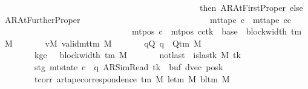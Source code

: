 \begin{isabellebody}
\ \ \ \ \ \ \ \ \ \ \ \ \ \ \ \ \ \ \ \ \ \ \ \ \ \ \ \ \ \ \ \ \ \ \ \ \ \ \ \ \ \ \ \ \ \ then\ AR{\isacharunderscore}{\kern0pt}AtFirstProper\ else\ AR{\isacharunderscore}{\kern0pt}AtFurtherProper{\isacharparenright}{\kern0pt}{\isacharparenright}{\kern0pt}\isanewline
\ \ \ \ \ \ \ \ \ \ \ \ \ \ \ \ \ \ \ \ \ \ \ \ \ \ \ \ \ {\isasymand}\ mt{\isacharunderscore}{\kern0pt}tape\ c{\isacharprime}{\kern0pt}{\isacharprime}{\kern0pt}\ {\isacharequal}{\kern0pt}\ mt{\isacharunderscore}{\kern0pt}tape\ cc\isanewline
\ \ \ \ \ \ \ \ \ \ \ \ \ \ \ \ \ \ \ \ \ \ \ \ \ \ \ \ \ {\isasymand}\ mt{\isacharunderscore}{\kern0pt}pos\ c{\isacharprime}{\kern0pt}{\isacharprime}{\kern0pt}\ {\isacharequal}{\kern0pt}\ {\isacharparenleft}{\kern0pt}mt{\isacharunderscore}{\kern0pt}pos\ cc{\isacharparenright}{\kern0pt}{\isacharparenleft}{\kern0pt}tk\ {\isacharcolon}{\kern0pt}{\isacharequal}{\kern0pt}\ base{\isacharprime}{\kern0pt}\ {\isacharplus}{\kern0pt}\ block{\isacharunderscore}{\kern0pt}width\ {\isacharparenleft}{\kern0pt}{\isasymGamma}{\isacharunderscore}{\kern0pt}tm\ M{\isacharparenright}{\kern0pt}{\isacharparenright}{\kern0pt}{\isachardoublequoteclose}\isanewline
\ \ \ \ \ \ \ vM{\isacharcolon}{\kern0pt}\ {\isachardoublequoteopen}valid{\isacharunderscore}{\kern0pt}mttm\ M{\isachardoublequoteclose}\isanewline
\ \ \ \ \ \ \ qQ{\isacharcolon}{\kern0pt}\ {\isachardoublequoteopen}q\ {\isasymin}\ Q{\isacharunderscore}{\kern0pt}tm\ M{\isachardoublequoteclose}\isanewline
\ \ \ \ \ \ \ kge{}{\isacharcolon}{\kern0pt}\ {\isachardoublequoteopen}{}\ {\isasymle}\ block{\isacharunderscore}{\kern0pt}width\ {\isacharparenleft}{\kern0pt}{\isasymGamma}{\isacharunderscore}{\kern0pt}tm\ M{\isacharparenright}{\kern0pt}{\isachardoublequoteclose}\isanewline
\ \ \ \ \ \ \ notlast{\isacharcolon}{\kern0pt}\ {\isachardoublequoteopen}{\isasymnot}\ is{\isacharunderscore}{\kern0pt}last{\isacharunderscore}{\kern0pt}k\ M\ tk{\isachardoublequoteclose}\isanewline
\ \ \ \ \ \ \ stg{\isacharcolon}{\kern0pt}\ {\isachardoublequoteopen}mt{\isacharunderscore}{\kern0pt}state\ c{\isacharprime}{\kern0pt}\ {\isacharequal}{\kern0pt}\ {\isacharparenleft}{\kern0pt}q{\isacharcomma}{\kern0pt}\ AR{\isacharunderscore}{\kern0pt}SimRead{\isacharcomma}{\kern0pt}\ tk{\isacharcomma}{\kern0pt}\ {}{\isacharcomma}{\kern0pt}\ buf{\isacharcomma}{\kern0pt}\ dvec{\isacharcomma}{\kern0pt}\ posk{\isacharparenright}{\kern0pt}{\isachardoublequoteclose}\isanewline
\ \ \ \ \ \ \ tcorr{\isacharcolon}{\kern0pt}\ {\isachardoublequoteopen}ar{\isacharunderscore}{\kern0pt}tape{\isacharunderscore}{\kern0pt}correspondence\ {\isacharparenleft}{\kern0pt}{\isasymGamma}{\isacharunderscore}{\kern0pt}tm\ M{\isacharparenright}{\kern0pt}\ {\isacharparenleft}{\kern0pt}le{\isacharunderscore}{\kern0pt}tm\ M{\isacharparenright}{\kern0pt}\ {\isacharparenleft}{\kern0pt}bl{\isacharunderscore}{\kern0pt}tm\ M{\isacharparenright}{\kern0pt}\isanewline

\end{isabellebody}
